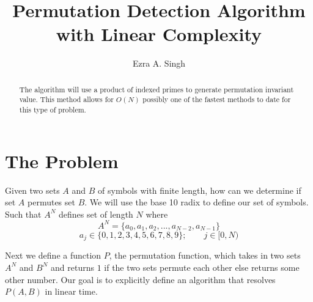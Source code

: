 \documentclass[]{article}
\title{Permutation Detection Algorithm with Linear Complexity}
\author{Ezra A. Singh}
\begin{document}
\maketitle

\begin{abstract}
The algorithm will use a product of indexed primes to generate permutation invariant value. This method allows for $O(N)$ possibly one of the fastest methods to date for this type of problem.
\end{abstract}

\section*{The Problem}
Given two sets $A$ and $B$ of symbols with finite length, how can we determine if set $A$ permutes set $B$. We will use the base 10 radix to define our set of symbols. Such that $A^{N}$ defines set of length $N$ where
\begin{equation}
A^{N}=\{a_{0}, a_{1}, a_{2}, ..., a_{N-2}, a_{N-1}\}
\end{equation}
\begin{equation}
a_{j} \in \{0,1, 2, 3, 4, 5, 6, 7, 8, 9\};\qquad j \in [0, N)
\end{equation}

Next we define a function $P$, the permutation function, which takes in two sets $A^{N}$ and $B^{N}$ and returns $1$ if the two sets permute each other else returns some other number. Our goal is to explicitly define an algorithm that resolves $P(A, B)$ in linear time.
\end{document}
